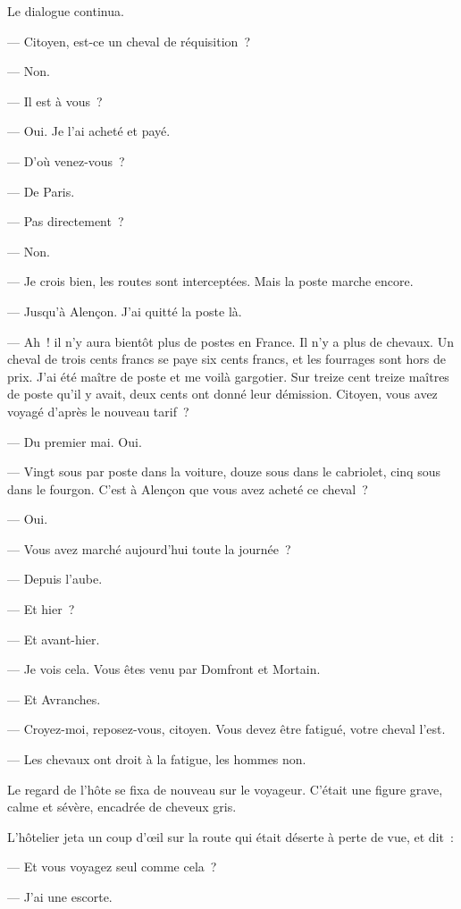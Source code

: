\documentclass[french,twoside]{book} %
\begin{document}
Le dialogue continua.\par
— Citoyen, est-ce un cheval de réquisition ?\par
— Non.\par
— Il est à vous ?\par
— Oui. Je l’ai acheté et payé.\par
 — D’où venez-vous ?\par
— De Paris.\par
— Pas directement ?\par
— Non.\par
— Je crois bien, les routes sont interceptées. Mais la poste marche encore.\par
— Jusqu’à Alençon. J’ai quitté la poste là.\par
— Ah ! il n’y aura bientôt plus de postes en France. Il n’y a plus de chevaux. Un cheval de trois cents francs se paye six cents francs, et les fourrages sont hors de prix. J’ai été maître de poste et me voilà gargotier. Sur treize cent treize maîtres de poste qu’il y avait, deux cents ont donné leur démission. Citoyen, vous avez voyagé d’après le nouveau tarif ?\par
— Du premier mai. Oui.\par
— Vingt sous par poste dans la voiture, douze sous dans le cabriolet, cinq sous dans le fourgon. C’est à Alençon que vous avez acheté ce cheval ?\par
— Oui.\par
— Vous avez marché aujourd’hui toute la journée ?\par
— Depuis l’aube.\par
— Et hier ?\par
— Et avant-hier.\par
— Je vois cela. Vous êtes venu par Domfront et Mortain.\par
— Et Avranches.\par
— Croyez-moi, reposez-vous, citoyen. Vous devez être fatigué, votre cheval l’est.\par
— Les chevaux ont droit à la fatigue, les hommes non.\par
 Le regard de l’hôte se fixa de nouveau sur le voyageur. C’était une figure grave, calme et sévère, encadrée de cheveux gris.\par
L’hôtelier jeta un coup d’œil sur la route qui était déserte à perte de vue, et dit :\par
— Et vous voyagez seul comme cela ?\par
— J’ai une escorte.\par
\end{document}
